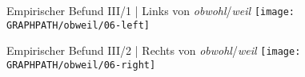 \begin{frame}
  {Empirischer Befund III/1 | Links von \textit{obwohl}\slash \textit{weil}}
  \centering 
  \texttt{[image: \\GRAPHPATH/obweil/06-left]}
\end{frame}

\begin{frame}
  {Empirischer Befund III/2 | Rechts von \textit{obwohl}\slash \textit{weil}}
  \centering 
  \texttt{[image: \\GRAPHPATH/obweil/06-right]}
\end{frame}



